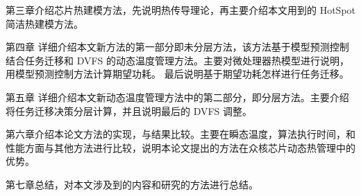 第三章介绍芯片热建模方法，先说明热传导理论，再主要介绍本文用到的 HotSpot 简洁热建模方法。

第四章 详细介绍本文新方法的第一部分即未分层方法，该方法基于模型预测控制结合任务迁移和 DVFS 的动态温度管理方法。主要对微处理器热模型进行说明，用模型预测控制方法计算期望功耗。
最后说明基于期望功耗怎样进行任务迁移。

第五章 详细介绍本文新动态温度管理方法中的第二部分，即分层方法。主要介绍将任务迁移决策分层计算，并且说明最后的 DVFS 调整。

第六章介绍本论文方法的实现，与结果比较。主要在瞬态温度，算法执行时间，和性能方面与其他方法进行比较，说明本论文提出的方法在众核芯片动态热管理中的优势。

第七章总结，对本文涉及到的内容和研究的方法进行总结。























